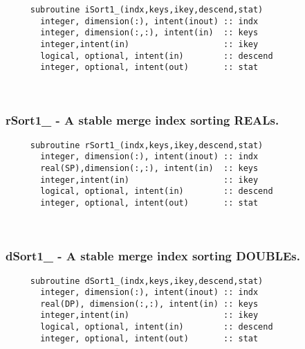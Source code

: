 \begin{verbatim} 
     subroutine iSort1_(indx,keys,ikey,descend,stat)
       integer, dimension(:), intent(inout) :: indx
       integer, dimension(:,:), intent(in)  :: keys
       integer,intent(in)                   :: ikey
       logical, optional, intent(in)        :: descend
       integer, optional, intent(out)       :: stat
 \end{verbatim}%
% 
 
\mbox{}\hrulefill\ 
 
  \subsubsection{rSort1\_ - A stable merge index sorting REALs.}

\begin{verbatim} 
     subroutine rSort1_(indx,keys,ikey,descend,stat)
       integer, dimension(:), intent(inout) :: indx
       real(SP),dimension(:,:), intent(in)  :: keys
       integer,intent(in)                   :: ikey
       logical, optional, intent(in)        :: descend
       integer, optional, intent(out)       :: stat
 \end{verbatim}%
 
 
\mbox{}\hrulefill\ 
 
  \subsubsection{dSort1\_ - A stable merge index sorting DOUBLEs.}

\begin{verbatim} 
     subroutine dSort1_(indx,keys,ikey,descend,stat)
       integer, dimension(:), intent(inout) :: indx
       real(DP), dimension(:,:), intent(in) :: keys
       integer,intent(in)                   :: ikey
       logical, optional, intent(in)        :: descend
       integer, optional, intent(out)       :: stat
 \end{verbatim}%
 
